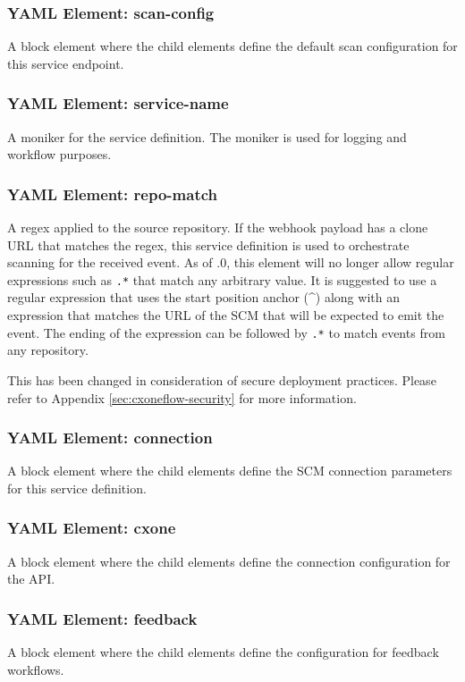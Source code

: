 \subsubsection{YAML Element: scan-config}\label{sec:yaml-moniker-scan-config}
A block element where the child elements define the default scan configuration for this service endpoint.

\subsubsection{YAML Element: service-name}\label{sec:yaml-moniker-service-name}
A moniker for the service definition. The moniker is used for logging and workflow purposes.

\subsubsection{YAML Element: repo-match}\label{sec:yaml-moniker-repo-match}
A regex applied to the source repository.  If the webhook payload has
a clone URL that matches the regex, this service definition is used to orchestrate scanning
for the received event.  As of .0, this element will no longer allow regular
expressions such as \texttt{.*} that match any arbitrary value.  It is suggested to use
a regular expression that uses the start position anchor (\^{}) along with an expression
that matches the URL of the SCM that will be expected to emit the event.  The ending of
the expression can be followed by \texttt{.*} to match events from any repository.

This has been changed in consideration of secure deployment practices.  Please refer to
Appendix \ref{sec:cxoneflow-security} for more information.

\subsubsection{YAML Element: connection}\label{sec:yaml-moniker-connection}
A block element where the child elements define the SCM connection parameters for this service definition.

\subsubsection{YAML Element: cxone}\label{sec:yaml-moniker-cxone}
A block element where the child elements define the connection configuration for the \cxone API. 

\subsubsection{YAML Element: feedback}\label{sec:yaml-moniker-feedback}
A block element where the child elements define the configuration for feedback workflows. 

